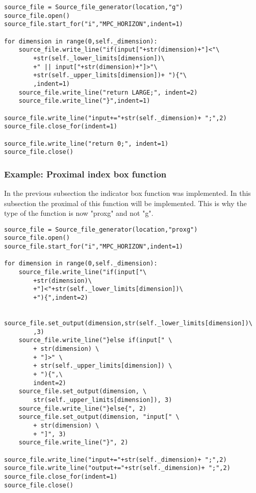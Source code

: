 \begin{lstlisting}[caption={example generate g function},captionpos=b,label={lst:example generate g function}]
source_file = Source_file_generator(location,"g")
source_file.open()
source_file.start_for("i","MPC_HORIZON",indent=1)

for dimension in range(0,self._dimension):
	source_file.write_line("if(input["+str(dimension)+"]<"\
		+str(self._lower_limits[dimension])\
		+" || input["+str(dimension)+"]>"\
		+str(self._upper_limits[dimension])+ "){"\
		,indent=1)
	source_file.write_line("return LARGE;", indent=2)
	source_file.write_line("}",indent=1)

source_file.write_line("input+="+str(self._dimension)+ ";",2)
source_file.close_for(indent=1)

source_file.write_line("return 0;", indent=1)
source_file.close()
\end{lstlisting}

\subsubsection{Example: Proximal index box function}
In the previous subsection the indicator box function was implemented. In this subsection the proximal of this function will be implemented. This is why the type of the function is now "proxg" and not "g".

\begin{lstlisting}[caption={example generate proxg function},captionpos=b,label={lst:example generate proxg function}]
source_file = Source_file_generator(location,"proxg")
source_file.open()
source_file.start_for("i","MPC_HORIZON",indent=1)

for dimension in range(0,self._dimension):
	source_file.write_line("if(input["\
		+str(dimension)\
		+"]<"+str(self._lower_limits[dimension])\
		+"){",indent=2)
		
	source_file.set_output(dimension,str(self._lower_limits[dimension])\
		,3)
	source_file.write_line("}else if(input[" \
		+ str(dimension) \
		+ "]>" \
		+ str(self._upper_limits[dimension]) \
		+ "){",\
		indent=2)
	source_file.set_output(dimension, \
		str(self._upper_limits[dimension]), 3)
	source_file.write_line("}else{", 2)
	source_file.set_output(dimension, "input[" \
		+ str(dimension) \
		+ "]", 3)
	source_file.write_line("}", 2)

source_file.write_line("input+="+str(self._dimension)+ ";",2)
source_file.write_line("output+="+str(self._dimension)+ ";",2)
source_file.close_for(indent=1)
source_file.close()
\end{lstlisting}